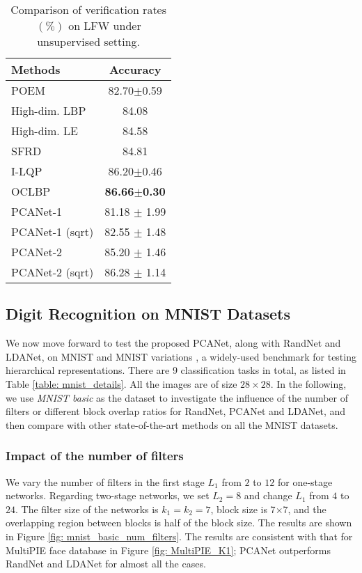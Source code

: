 \documentclass[10pt,journal,compsoc]{IEEEtran}
\begin{document}
\begin{table}[htbp]\centering
\caption{Comparison of verification rates $(\%)$ on LFW under unsupervised setting.}
\begin{tabular}{l|c}
  \hline
Methods           & Accuracy \\  \hline \hline
  POEM \cite{Vu2012}  & 82.70$\pm$0.59 \\
  High-dim. LBP \cite{Chen2013}  & 84.08 \\
  High-dim. LE \cite{Chen2013}  & 84.58 \\
  SFRD \cite{Cui2013}  & 84.81  \\
  I-LQP \cite{Hussain2012} & 86.20$\pm$0.46 \\
  OCLBP \cite{Barkan2013} & {\bf 86.66$\pm$0.30} \\  \hline
PCANet-1  & 81.18 $\pm$ 1.99  \\
  PCANet-1 ({\rm sqrt})  & 82.55 $\pm$ 1.48  \\
  PCANet-2  & 85.20 $\pm$ 1.46  \\
  PCANet-2 ({\rm sqrt}) & 86.28 $\pm$ 1.14  \\
  \hline
\end{tabular}\label{table: LFW}
\end{table}


\subsection{Digit Recognition on MNIST Datasets}
We now move forward to test the proposed PCANet, along with RandNet and LDANet, on MNIST \cite{LeCun1998} and MNIST variations \cite{Larochelle2007}, a widely-used benchmark for testing hierarchical representations. There are 9 classification tasks in total, as listed in Table \ref{table: mnist_details}. All the images are of size $28\times 28$. In the following, we use {\em MNIST basic} as the dataset to investigate the influence of the number of filters or different block overlap ratios for RandNet, PCANet and LDANet, and then compare with other state-of-the-art methods on all the MNIST datasets.

\subsubsection{Impact of the number of filters}
We vary the number of filters in the first stage $L_1$ from $2$ to $12$ for one-stage networks. Regarding two-stage networks, we set $L_2=8$ and change $L_1$ from $4$ to $24$. The filter size of the networks is $k_1 = k_2 = 7$, block size is 7$\times$7, and the overlapping region between blocks is half of the block size. The results are shown in Figure \ref{fig: mnist_basic_num_filters}. The results are consistent with that for MultiPIE face database in Figure \ref{fig: MultiPIE_K1}; PCANet outperforms RandNet and LDANet for almost all the cases.
\end{document}
